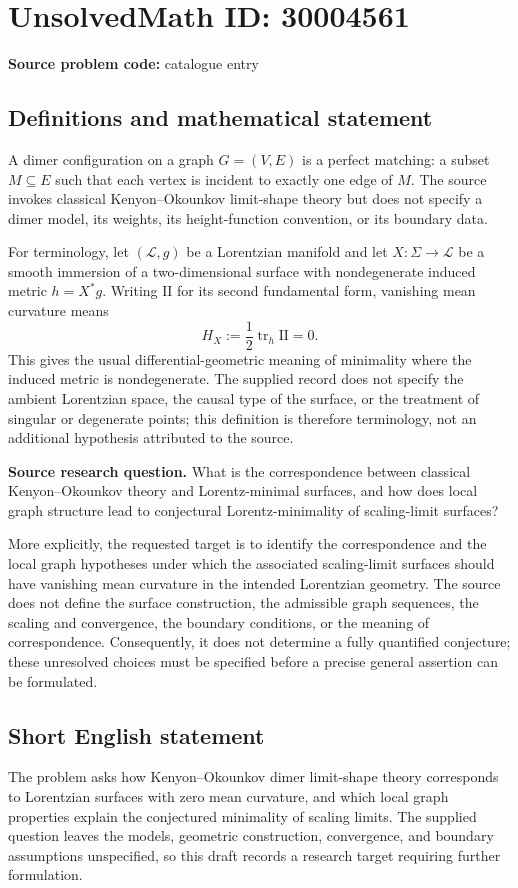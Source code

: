 \documentclass[11pt]{article}
\begin{document}
\section*{UnsolvedMath ID: 30004561}
\textbf{Source problem code:} catalogue entry
\subsection{Definitions and mathematical statement}
A dimer configuration on a graph \(G=(V,E)\) is a perfect matching: a subset \(M\subseteq E\) such that each vertex is incident to exactly one edge of \(M\). The source invokes classical Kenyon--Okounkov limit-shape theory but does not specify a dimer model, its weights, its height-function convention, or its boundary data.

For terminology, let \((\mathcal L,g)\) be a Lorentzian manifold and let \(X:\Sigma\to\mathcal L\) be a smooth immersion of a two-dimensional surface with nondegenerate induced metric \(h=X^*g\). Writing \(\mathrm{II}\) for its second fundamental form, vanishing mean curvature means
\[
H_X:=\frac12\operatorname{tr}_{h}\mathrm{II}=0.
\]
This gives the usual differential-geometric meaning of minimality where the induced metric is nondegenerate. The supplied record does not specify the ambient Lorentzian space, the causal type of the surface, or the treatment of singular or degenerate points; this definition is therefore terminology, not an additional hypothesis attributed to the source.

\textbf{Source research question.} What is the correspondence between classical Kenyon--Okounkov theory and Lorentz-minimal surfaces, and how does local graph structure lead to conjectural Lorentz-minimality of scaling-limit surfaces?

More explicitly, the requested target is to identify the correspondence and the local graph hypotheses under which the associated scaling-limit surfaces should have vanishing mean curvature in the intended Lorentzian geometry. The source does not define the surface construction, the admissible graph sequences, the scaling and convergence, the boundary conditions, or the meaning of correspondence. Consequently, it does not determine a fully quantified conjecture; these unresolved choices must be specified before a precise general assertion can be formulated.
\subsection{Short English statement}
The problem asks how Kenyon--Okounkov dimer limit-shape theory corresponds to Lorentzian surfaces with zero mean curvature, and which local graph properties explain the conjectured minimality of scaling limits. The supplied question leaves the models, geometric construction, convergence, and boundary assumptions unspecified, so this draft records a research target requiring further formulation.
\end{document}
